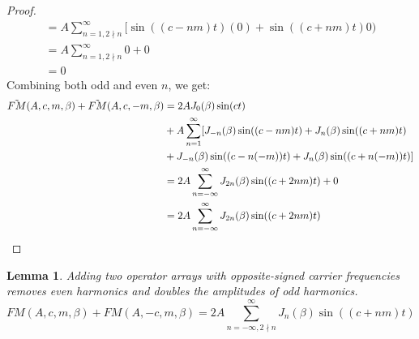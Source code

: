 \documentclass[11pt,twoside]{report}
\newtheorem{lem}[thm]{Lemma}
\numberwithin{thm}{section}
\numberwithin{equation}{section}
\begin{document}
\begin{proof}
\begin{align*}
    = A\sum_{n=1, 2\nmid n}^\infty [ \sin((c-nm)t)(0) + \sin((c+nm)t)0 ) \\
    = A\sum_{n=1, 2\nmid n}^\infty 0 + 0 \\
    = 0
\end{align*}
Combining both odd and even $n$, we get:
\begin{align*}
\Tilde{FM}(A, c, m, \beta) + \Tilde{FM}(A, c, -m, \beta) &= 2A J_0(\beta)\sin(ct) \\
&+ A\sum_{n=1}^\infty [ J_{-n}(\beta)\sin((c-nm)t) + J_{n}(\beta)\sin((c+nm)t)  \\
    &+ J_{-n}(\beta)\sin((c-n(-m))t) + J_{n}(\beta)\sin((c+n(-m))t) ]\\
    &= 2A \sum_{n=-\infty}^\infty J_{2n}(\beta)\sin((c + 2nm)t) + 0 \\
    &= 2A \sum_{n=-\infty}^\infty J_{2n}(\beta)\sin((c + 2nm)t) 
\end{align*}
\end{proof}

\begin{lem} Adding two operator arrays with opposite-signed carrier frequencies removes even harmonics and doubles the amplitudes of odd harmonics.
$$\displaystyle FM(A, c, m, \beta) + FM(A, -c, m, \beta) = 2A\sum_{n=-\infty, 2\nmid n}^\infty J_{n}(\beta)\sin((c + nm)t)$$
\end{lem}
\end{document}
